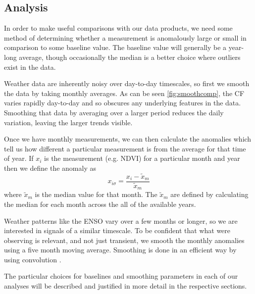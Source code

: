\subsection{Analysis}
In order to make useful comparisons with our data products, we need some method
of determining whether a measurement is anomalously large or small in comparison
to some baseline value. The baseline value will generally be a year-long
average, though occasionally the median is a better choice where outliers exist
in the data. 

Weather data are inherently noisy over day-to-day timescales, so first we smooth
the data by taking monthly averages. As can be seen \ref{fig:smoothcomp}, the CF
varies rapidly day-to-day and so obscures any underlying features in the
data. Smoothing that data by averaging over a larger period reduces the daily
variation, leaving the larger trends visible. 

Once we have monthly measurements, we can then calculate the anomalies which
tell us how different a particular measurement is from the average for that time
of year. If $x_{i}$ is the measurement (e.g. NDVI) for a particular month and
year then we define the anomaly as
\begin{equation}
  x_{i\sigma}=\frac{x_{i}-\tilde{x}_m}{\tilde{x}_m}
  \label{eq:anoms}
\end{equation}
where $\tilde{x}_m$ is the median value for that month. The $\tilde{x}_m$ are
defined by calculating the median for each month across the all of the available
years.

Weather patterns like the ENSO vary over a few months or longer, so we are
interested in signals of a similar timescale. To be confident that what were
observing is relevant, and not just transient, we smooth the monthly anomalies
using a five month moving average. Smoothing is done in an efficient way by
using convolution \citep{gorry1990}.

The particular choices for baselines and smoothing parameters in each of our
analyses will be described and justified in more detail in the respective
sections.


